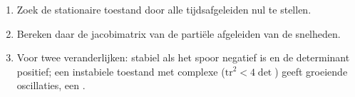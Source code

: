 \begin{method}\label{met:b3:complex-kinetics:stability}
\begin{enumerate}
  \item Zoek de stationaire toestand door alle tijdsafgeleiden nul te stellen.
  \item Bereken daar de jacobimatrix van de partiële afgeleiden van de snelheden.
  \item Voor twee veranderlijken: stabiel als het spoor negatief is en de
        determinant positief; een instabiele toestand met complexe
        ($\mathrm{tr}^2 < 4\det$) geeft groeiende oscillaties, een .
\end{enumerate}
\end{method}

